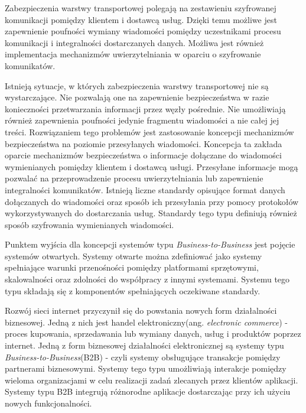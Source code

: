 		Zabezpieczenia warstwy transportowej polegają na zestawieniu szyfrowanej komunikacji pomiędzy klientem i dostawcą usług. Dzięki temu możliwe jest zapewnienie poufności wymiany wiadomości pomiędzy uczestnikami procesu komunikacji i integralności dostarczanych danych. Możliwa jest również implementacja mechanizmów uwierzytelniania w oparciu o szyfrowanie komunikatów\cite{Kolaczek09}.

		Istnieją sytuacje, w których zabezpieczenia warstwy transportowej nie są wystarczające.  Nie pozwalają one na zapewnienie bezpieczeństwa w razie konieczności przetwarzania informacji przez węzły pośrednie. Nie umożliwiają również zapewnienia poufności jedynie fragmentu wiadomości a nie całej jej treści. Rozwiązaniem tego problemów jest zastosowanie koncepcji mechanizmów bezpieczeństwa na poziomie przesyłanych wiadomości. Koncepcja ta zakłada oparcie mechanizmów bezpieczeństwa o informacje dołączane do wiadomości wymienianych pomiędzy klientem i dostawcą usługi. Przesyłane informacje mogą pozwalać na przeprowadzenie procesu uwierzytelniania lub zapewnienie integralności komunikatów. Istnieją liczne standardy opisujące format danych dołączanych do wiadomości oraz sposób ich przesyłania przy pomocy protokołów wykorzystywanych do dostarczania usług. Standardy tego typu definiują również sposób szyfrowania wymienianych wiadomości.		

\label{sec:wymaganiaB2B}

Punktem wyjścia dla koncepcji systemów typu \textit{Business-to-Business} jest pojęcie systemów otwartych. Systemy otwarte można zdefiniować jako systemy spełniające warunki przenośności pomiędzy platformami sprzętowymi, skalowalności oraz zdolności do współpracy z innymi systemami\cite{Kajan04}. Systemu tego typu składają się z komponentów spełniających oczekiwane standardy. 

Rozwój sieci internet przyczynił się do powstania nowych form działalności biznesowej. Jedną z nich jest handel elektroniczny(ang. \textit{electronic commerce}) - proces kupowania, sprzedawania lub wymiany danych, usług i produktów poprzez internet. Jedną z form biznesowej działalności elektronicznej są systemy typu \textit{Business-to-Business}(B2B) - czyli systemy obsługujące transakcje pomiędzy partnerami biznesowymi. Systemy tego typu umożliwiają interakcje pomiędzy wieloma organizacjami w celu realizacji zadań zlecanych przez klientów aplikacji. Systemy typu B2B integrują różnorodne aplikacje dostarczając przy ich użyciu nowych funkcjonalności. 

